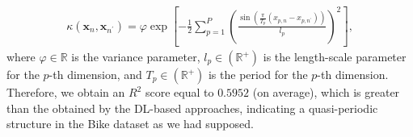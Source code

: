 \documentclass[journal]{IEEEtran}
\providecommand{\ve}[1]{{\bm{#1}}}%
\newcommand{\Real}{\mathbb{R}}
\providecommand{\ve}[1]{{\mathbf{#1}}}
\begin{document}
\begin{align}\label{eq:Pkernel}
\kappa(\ve{x}_n, \ve{x}_{n^{\prime}}) = \varphi \exp \left[  - \frac{1}{2}\sum_{p=1}^{P}\left( \frac{\sin(\frac{\pi}{T_p} (x_{p,n}- x_{p,n^{\prime}}) )}{l_p}\right)^2 \right],
\end{align}
where $\varphi\in \Real$ is the variance parameter, $l_p\in (\Real^{+})$ is the length-scale parameter for the $p$-th dimension, and $T_p\in (\Real^{+})$ is the period for the $p$-th dimension. Therefore, we obtain an $R^2$ score equal to $0.5952$ (on average), which is greater than the obtained by the DL-based approaches, indicating a quasi-periodic structure in the Bike dataset as we had supposed.
% 










\end{document}
